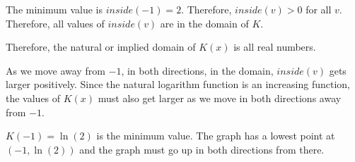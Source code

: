 \documentclass{ximera}
\begin{document}
The minimum value is $inside(-1) = 2$.  Therefore, $inside(v) > 0$ for all $v$. Therefore, all values of $inside(v)$ are in the domain of $K$.

Therefore, the natural or implied domain of $K(x)$ is all real numbers.


As we move away from $-1$, in both directions, in the domain, $inside(v)$ gets larger positively. Since the natural logarithm function is an increasing function, the values of $K(x)$ must also get larger as we move in both directions away from $-1$.


$K(-1) = \ln(2)$ is the minimum value.  The graph has a lowest point at $(-1, \ln(2))$ and the graph must go up in both directions from there.








\begin{image}
\end{image}
\end{document}
